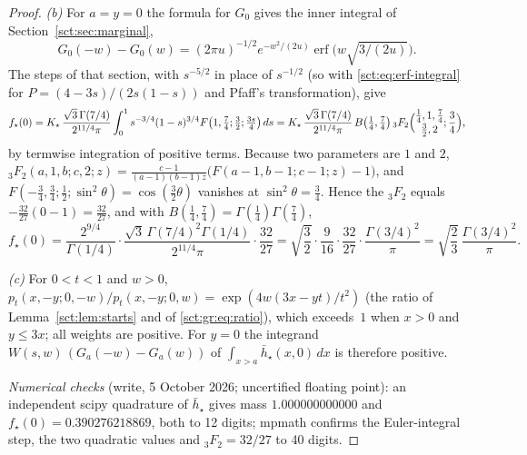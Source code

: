 \documentclass[11pt,letterpaper]{article}
\theoremstyle{definition}\newtheorem{remark}[theorem]{Remark}
\newcommand{\hstar}{\bar h_\star}\newcommand{\fstar}{f_\star}\newcommand{\Kstar}{K_\star}
\newcommand{\erf}{\operatorname{erf}}
\begin{document}
\begin{proof}
\emph{(b)} For $a=y=0$ the formula for $G_0$ gives the inner integral of Section~\ref{sct:sec:marginal},
\[
 G_0(-w)-G_0(w)=(2\pi u)^{-1/2}e^{-w^2/(2u)}\erf\bigl(w\sqrt{3/(2u)}\bigr).
\]
The steps of that section, with $s^{-5/2}$ in place of $s^{-1/2}$ (so with \eqref{sct:eq:erf-integral} for $P=(4-3s)/(2s(1-s))$ and Pfaff's transformation), give
\[
 \fstar(0)=\Kstar\,\frac{\sqrt3\,\Gamma(7/4)}{2^{11/4}\pi}\int_0^1s^{-3/4}(1-s)^{3/4}
 F\bigl(1,\tfrac74;\tfrac32;\tfrac{3s}4\bigr)\,ds
 =\Kstar\,\frac{\sqrt3\,\Gamma(7/4)}{2^{11/4}\pi}\,B\bigl(\tfrac14,\tfrac74\bigr)\,
 {}_3F_2\Bigl(\begin{matrix}\frac14,1,\frac74\\[1pt]\frac32,2\end{matrix};\frac34\Bigr),
\]
by termwise integration of positive terms. Because two parameters are $1$ and $2$,
${}_3F_2(a,1,b;c,2;z)=\frac{c-1}{(a-1)(b-1)z}\bigl(F(a-1,b-1;c-1;z)-1\bigr)$, and $F(-\frac34,\frac34;\frac12;\sin^2\theta)=\cos(\frac32\theta)$ \cite[\S15.4(i)]{dlmf} vanishes at $\sin^2\theta=\frac34$. Hence the ${}_3F_2$ equals $-\frac{32}{27}(0-1)=\frac{32}{27}$, and with $B(\frac14,\frac74)=\Gamma(\frac14)\Gamma(\frac74)$,
\[
 \fstar(0)=\frac{2^{9/4}}{\Gamma(1/4)}\cdot\frac{\sqrt3\,\Gamma(7/4)^2\Gamma(1/4)}{2^{11/4}\pi}\cdot\frac{32}{27}
 =\sqrt{\frac32}\cdot\frac{9}{16}\cdot\frac{32}{27}\cdot\frac{\Gamma(3/4)^2}{\pi}
 =\sqrt{\frac23}\,\frac{\Gamma(3/4)^2}{\pi}.
\]

\emph{(c)} For $0<t<1$ and $w>0$, $p_t(x,-y;0,-w)/p_t(x,-y;0,w)=\exp(4w(3x-yt)/t^2)$ (the ratio of Lemma~\ref{sct:lem:starts} and of \eqref{sct:gr:eq:ratio}), which exceeds~$1$ when $x>0$ and $y\le3x$; all weights are positive. For $y=0$ the integrand $W(s,w)\,(G_a(-w)-G_a(w))$ of $\int_{x>a}\hstar(x,0)\,dx$ is therefore positive.

\emph{Numerical checks} (write, 5 October 2026; uncertified floating point): an independent scipy quadrature of $\hstar$ gives mass $1.000000000000$ and $\fstar(0)=0.390276218869$, both to 12 digits; mpmath confirms the Euler-integral step, the two quadratic values and ${}_3F_2=32/27$ to 40 digits.
\end{proof}
\end{document}
